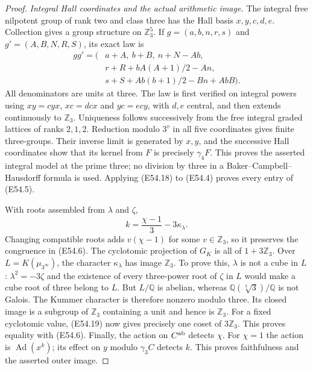 \begin{proof}
\emph{Integral Hall coordinates and the actual arithmetic image.}
The integral free nilpotent group of rank two and class three
has the Hall basis $x,y,c,d,e$. Collection gives a group
structure on $\mathbb Z_3^5$. If
$g=(a,b,n,r,s)$ and $g'=(A,B,N,R,S)$, its exact law is
\[
 \begin{split}
 gg'=\big(&a+A,\ b+B,\ n+N-Ab,\\
          &r+R+bA(A+1)/2-An,\\
          &s+S+Ab(b+1)/2-Bn+AbB\big).
 \end{split}
 \tag{E54.18}
\]
All denominators are units at three. The law is first
verified on integral powers using
$xy=cyx$, $xc=dcx$ and $yc=ecy$, with $d,e$ central,
and then extends continuously to $\mathbb Z_3$.
Uniqueness follows successively from the free integral
graded lattices of ranks $2,1,2$. Reduction modulo
$3^v$ in all five coordinates gives finite three-groups.
Their inverse limit is generated by $x,y$, and the
successive Hall coordinates show that its kernel from
$F$ is precisely $\gamma_4F$. This proves the asserted
integral model at the prime three; no division by three
in a Baker--Campbell--Hausdorff formula is used.
Applying (E54.18) to (E54.4) proves every entry of
(E54.5).

With roots assembled from $\lambda$ and $\zeta$,
\[
       k=\frac{\chi-1}{3}-3\kappa_\lambda.
 \tag{E54.19}
\]
Changing compatible roots adds $v(\chi-1)$ for some
$v\in\mathbb Z_3$, so it preserves the congruence in
(E54.6). The cyclotomic projection of $G_K$ is all of
$1+3\mathbb Z_3$. Over $L=K(\mu_{3^\infty})$, the
character $\kappa_\lambda$ has image $\mathbb Z_3$.
To prove this, $\lambda$ is not a cube in $L$:
$\lambda^2=-3\zeta$ and the existence of every
three-power root of $\zeta$ in $L$ would make a cube
root of three belong to $L$. But $L/\mathbb Q$ is
abelian, whereas $\mathbb Q(\sqrt[3]{3})/\mathbb Q$
is not Galois. The Kummer character is therefore
nonzero modulo three. Its closed image is a subgroup
of $\mathbb Z_3$ containing a unit and hence is
$\mathbb Z_3$. For a fixed cyclotomic value, (E54.19)
now gives precisely one coset of $3\mathbb Z_3$.
This proves equality with (E54.6).
Finally, the action on $C^{\rm ab}$ detects $\chi$.
For $\chi=1$ the action is $\operatorname{Ad}(x^k)$;
its effect on $y$ modulo $\gamma_3C$ detects $k$.
This proves faithfulness and the asserted outer image.


\end{proof}
